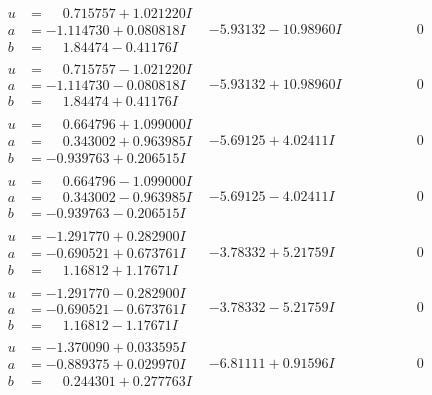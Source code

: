 \documentclass[1p]{elsarticle_modified}
\theoremstyle{definition}
\begin{document}
$$\begin{array}{c|c|c}
\begin{aligned}
u &= \phantom{-}0.715757 + 1.021220 I \\
a &= -1.114730 + 0.080818 I \\
b &= \phantom{-}1.84474 - 0.41176 I\end{aligned}
 & -5.93132 - 10.98960 I & \phantom{-0.000000 } 0 \\ \hline\begin{aligned}
u &= \phantom{-}0.715757 - 1.021220 I \\
a &= -1.114730 - 0.080818 I \\
b &= \phantom{-}1.84474 + 0.41176 I\end{aligned}
 & -5.93132 + 10.98960 I & \phantom{-0.000000 } 0 \\ \hline\begin{aligned}
u &= \phantom{-}0.664796 + 1.099000 I \\
a &= \phantom{-}0.343002 + 0.963985 I \\
b &= -0.939763 + 0.206515 I\end{aligned}
 & -5.69125 + 4.02411 I & \phantom{-0.000000 } 0 \\ \hline\begin{aligned}
u &= \phantom{-}0.664796 - 1.099000 I \\
a &= \phantom{-}0.343002 - 0.963985 I \\
b &= -0.939763 - 0.206515 I\end{aligned}
 & -5.69125 - 4.02411 I & \phantom{-0.000000 } 0 \\ \hline\begin{aligned}
u &= -1.291770 + 0.282900 I \\
a &= -0.690521 + 0.673761 I \\
b &= \phantom{-}1.16812 + 1.17671 I\end{aligned}
 & -3.78332 + 5.21759 I & \phantom{-0.000000 } 0 \\ \hline\begin{aligned}
u &= -1.291770 - 0.282900 I \\
a &= -0.690521 - 0.673761 I \\
b &= \phantom{-}1.16812 - 1.17671 I\end{aligned}
 & -3.78332 - 5.21759 I & \phantom{-0.000000 } 0 \\ \hline\begin{aligned}
u &= -1.370090 + 0.033595 I \\
a &= -0.889375 + 0.029970 I \\
b &= \phantom{-}0.244301 + 0.277763 I\end{aligned}
 & -6.81111 + 0.91596 I & \phantom{-0.000000 } 0 \\ \hline\begin{aligned}

\end{aligned}
\end{array}$$
\end{document}
